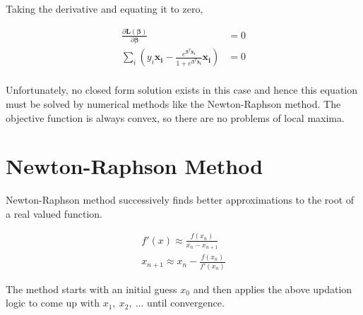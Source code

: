 \documentclass[11pt, a4paper]{article}
\begin{document}
Taking the derivative and equating it to zero,


\begin{align*}
	\frac{\partial \boldsymbol{L}(\boldsymbol{\beta})} {\partial \boldsymbol{\beta}}                                                                          & = 0 \\
	\sum_i \left(y_i \boldsymbol{x_i} - \frac{e^{\boldsymbol{\beta}^T\boldsymbol{x_i}}}{1 + e^{\boldsymbol{\beta}^T\boldsymbol{x_i}}} \boldsymbol{x_i}\right) & = 0 \\
\end{align*}

Unfortunately, no closed form solution exists in this case and hence this equation must be solved by numerical methods like the Newton-Raphson method. The objective function is always convex, so there are no problems of local maxima.

\section {Newton-Raphson Method}

Newton-Raphson method successively finds better approximations to the root of a real valued function.

\begin{figure}[htbp]
	\centering
\end{figure}

\begin{align*}
	f'(x) \approx \frac{f(x_n)}{x_n - x_{n+1}}   \\
	x_{n+1} \approx x_n - \frac{f(x_n)}{f'(x_n)} 
\end{align*}

The method starts with an initial guess $x_0$ and then applies the above updation logic to come up with $x_1,\ x_2,\ ...$ until convergence.
\end{document}
